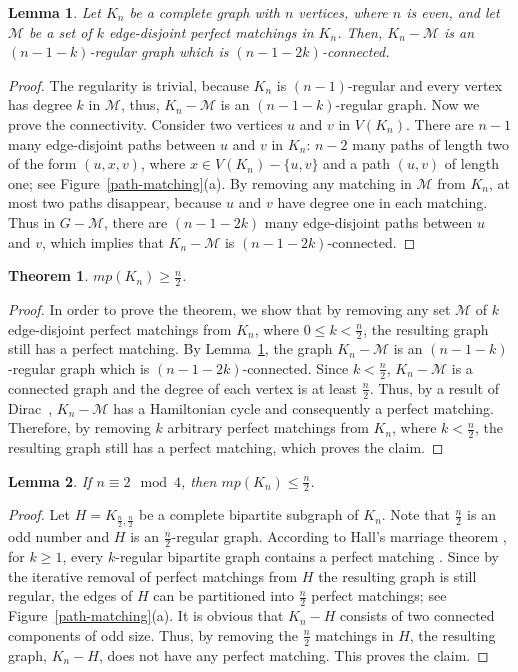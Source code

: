 \documentclass[11pt,a4paper]{article}
\newtheorem{lemma}{Lemma}
\newtheorem{theorem}{Theorem}
\begin{document}
\begin{lemma}
\label{regularity-connectivity}
Let $K_n$ be a complete graph with $n$ vertices, where $n$ is even, and let $\mathcal{M}$ be a set of $k$ edge-disjoint perfect matchings in $K_n$. Then, $K_n-\mathcal{M}$ is an $(n-1-k)$-regular graph which is $(n-1-2k)$-connected.
\end{lemma}
\begin{proof}
The regularity is trivial, because $K_n$ is $(n-1)$-regular and every vertex has degree $k$ in $\mathcal{M}$, thus, $K_n-\mathcal{M}$ is an $(n-1-k)$-regular graph. Now we prove the connectivity. Consider two vertices $u$ and $v$ in $V(K_n)$. There are $n-1$ many edge-disjoint paths between $u$ and $v$ in $K_n$: $n-2$ many paths of length two of the form $(u,x,v)$, where $x\in V(K_n)-\{u,v\}$ and a path $(u,v)$ of length one; see Figure~\ref{path-matching}(a). By removing any matching in $\mathcal{M}$ from $K_n$, at most two paths disappear, because $u$ and $v$ have degree one in each matching. Thus in $G-\mathcal{M}$, there are $(n-1-2k)$ many edge-disjoint paths between $u$ and $v$, which implies that $K_n-\mathcal{M}$ is $(n-1-2k)$-connected.
\end{proof}

\begin{theorem}
\label{mp-thr}
 $mp(K_n)\ge\frac{n}{2}$.
\end{theorem}
\begin{proof}
In order to prove the theorem, we show that by removing any set $\mathcal{M}$ of $k$ edge-disjoint perfect matchings from $K_n$, where $0\le k<\frac{n}{2}$, the resulting graph still has a perfect matching. By Lemma~\ref{regularity-connectivity}, the graph $K_n-\mathcal{M}$ is an $(n-1-k)$-regular graph which is $(n-1-2k)$-connected. Since $k<\frac{n}{2}$, $K_n-\mathcal{M}$ is a connected graph and the degree of each vertex is at least $\frac{n}{2}$. Thus, by a result of 
Dirac~\cite{Dirac1952}, $K_n-\mathcal{M}$ has a Hamiltonian cycle and consequently a perfect matching. Therefore, by removing $k$ arbitrary perfect matchings from $K_n$, where $k<\frac{n}{2}$, the resulting graph still has a perfect matching, which proves the claim.
\end{proof}

\begin{lemma}
\label{bipartite-matchings-lemma}
 If $n\equiv 2 \mod 4$, then $mp(K_n)\le\frac{n}{2}$.
\end{lemma}
\begin{proof}
Let $H=K_{\frac{n}{2},\frac{n}{2}}$ be a complete bipartite subgraph of $K_n$. Note that $\frac{n}{2}$ is an odd number and $H$ is an $\frac{n}{2}$-regular graph.
According to Hall's marriage theorem \cite{Hall1935}, for $k\ge 1$, every $k$-regular bipartite graph contains a perfect matching \cite{Harary1991}. Since by the iterative removal of perfect matchings  from $H$ the resulting graph is still regular, the edges of $H$ can be partitioned into $\frac{n}{2}$ perfect matchings; see Figure~\ref{path-matching}(a). It is obvious that $K_n-H$ consists of two connected components of odd size. Thus, by removing the $\frac{n}{2}$ matchings in $H$, the resulting graph, $K_n-H$, does not have any perfect matching. This proves the claim.
\end{proof}
\end{document}
